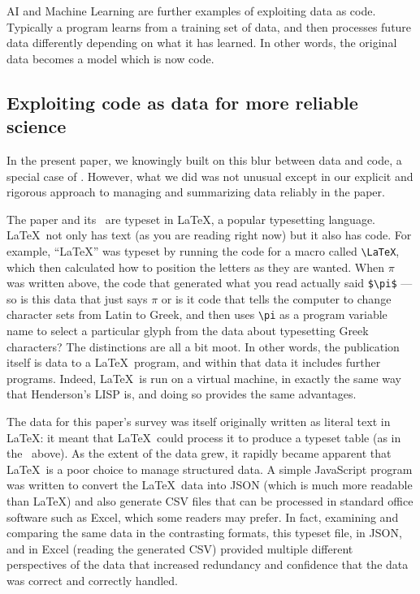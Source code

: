 \documentclass[10pt,a4paper]{article}
\begin{document}
AI and Machine Learning are further examples of exploiting data as code. Typically a program learns from a training set of data, and then processes future data differently depending on what it has learned. In other words, the original data becomes a model which is now code.

\subsection{Exploiting code as data for more reliable science}
In the present paper, we knowingly built on this blur between data and code, a special case of \RAPstarp. However, what we did was not unusual except in our explicit and rigorous approach to managing and summarizing data reliably in the paper.

The paper and its \supplement\ are typeset in \LaTeX, a popular typesetting language. \LaTeX\ not only has text (as you are reading right now) but it also has code. For example, ``\LaTeX'' was typeset by running the code for a macro called \verb|\LaTeX|, which then calculated how to position the letters as they are wanted. When $\pi$ was written above, the code that generated what you read actually said \verb|$\pi$| --- so is this data that just says $\pi$ or is it code that tells the computer to change character sets from Latin to Greek, and then uses \verb|\pi| as a program variable name to select a particular glyph from the data about typesetting Greek characters? The distinctions are all a bit moot. In other words, the publication itself is data to a \LaTeX\ program, and within that data it includes further programs. Indeed, \LaTeX\ is run on a virtual machine, in exactly the same way that Henderson's LISP is, and doing so provides the same advantages.

The data for this paper's survey was itself originally written as literal text in \LaTeX: it meant that \LaTeX\ could process it to produce a typeset table (as in the \supplement\ above). As the extent of the data grew, it rapidly became apparent that \LaTeX\ is a poor choice to manage structured data. A simple JavaScript program was written to convert the \LaTeX\ data into JSON (which is much more readable than \LaTeX) and also generate CSV files that can be processed in standard office software such as Excel, which some readers may prefer. In fact, examining and comparing the same data in the contrasting formats, this typeset file, in JSON, and in Excel (reading the generated CSV) provided multiple different perspectives of the data that increased redundancy and confidence that the data was correct and correctly handled. 
\end{document}

